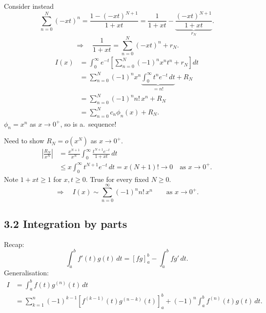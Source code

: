 \documentclass[11pt,a4paper]{article}
\begin{document}
Consider instead
\[
    \sum_{n=0}^N(-xt)^n
    =\frac{1-(-xt)^{N+1}}{1+xt}
    =\frac{1}{1+xt}-\underbrace{\frac{(-xt)^{N+1}}{1+xt}}_{r_N}.
\]
\[
    \Rightarrow\quad\frac{1}{1+xt}=\sum_{n=0}^N(-xt)^n+r_N.
\]
\begin{align*}
    I(x)&=\int_0^\infty e^{-t}
    \left[\sum_{n=0}^N(-1)^n x^n t^n+r_N\right]dt\\
    &=\sum_{n=0}^N(-1)^n x^n
    \underbrace{\int_0^\infty t^n e^{-t}\,dt}_{=n!}+R_N\\
    &=\sum_{n=0}^N(-1)^n n!\,x^n+R_N\\
    &=\sum_{n=0}^N c_n\phi_n(x)+R_N.
\end{align*}
$\phi_n=x^n$ as $x\to0^+$, so is a.\ sequence!

Need to show $R_N=o(x^N)$ as $x\to0^+$.
\[
    \begin{aligned}
        \left|\frac{R_N}{x^N}\right|
        &=\frac{x^{N+1}}{x^N}\int_0^\infty
        \frac{t^{N+1}e^{-t}}{1+xt}\,dt\\
        &\leq x\int_0^\infty t^{N+1}e^{-t}\,dt
        =x(N+1)!\longrightarrow0
        \quad\text{as }x\to0^+.
    \end{aligned}
\]
Note $1+xt\geq1$ for $x,t\geq0$.
True for every fixed $N\geq0$.
\[
    \Rightarrow\quad I(x)\sim\sum_{n=0}^\infty(-1)^n n!\,x^n
    \qquad\text{as }x\to0^+.
\]

\subsection*{3.2 Integration by parts}

Recap:
\[
    \int_a^b f'(t)g(t)\,dt
    =[fg]_a^b-\int_a^b fg'\,dt.
\]
Generalisation:
\begin{align*}
    I&=\int_a^b f(t)g^{(n)}(t)\,dt\\
    &=\sum_{k=1}^n(-1)^{k-1}
    \left[f^{(k-1)}(t)g^{(n-k)}(t)\right]_a^b
    +(-1)^n\int_a^b f^{(n)}(t)g(t)\,dt.
\end{align*}
\end{document}
